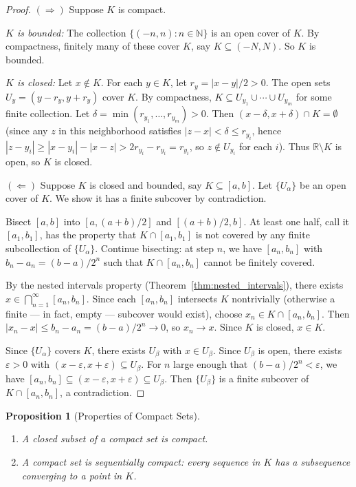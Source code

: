 \documentclass[11pt,a4paper]{article}
\theoremstyle{definition}
\theoremstyle{plain}
\newtheorem{proposition}[theorem]{Proposition}
\theoremstyle{remark}
\newcommand{\R}{\mathbb{R}}
\newcommand{\N}{\mathbb{N}}
\begin{document}
\begin{proof}
$(\Rightarrow)$ Suppose $K$ is compact.

\emph{$K$ is bounded:} The collection $\{(-n, n) : n \in \N\}$ is an open cover
of $K$. By compactness, finitely many of these cover $K$, say
$K \subseteq (-N, N)$. So $K$ is bounded.

\emph{$K$ is closed:} Let $x \notin K$. For each $y \in K$, let
$r_y = |x - y|/2 > 0$. The open sets $U_y = (y - r_y, y + r_y)$ cover $K$.
By compactness, $K \subseteq U_{y_1} \cup \cdots \cup U_{y_m}$ for some finite
collection. Let $\delta = \min(r_{y_1}, \ldots, r_{y_m}) > 0$. Then
$(x - \delta, x + \delta) \cap K = \emptyset$ (since any $z$ in this
neighborhood satisfies $|z - x| < \delta \le r_{y_i}$, hence
$|z - y_i| \ge |x - y_i| - |x - z| > 2r_{y_i} - r_{y_i} = r_{y_i}$,
so $z \notin U_{y_i}$ for each $i$). Thus $\R \setminus K$ is open, so $K$ is
closed.

$(\Leftarrow)$ Suppose $K$ is closed and bounded, say $K \subseteq [a, b]$. Let
$\{U_\alpha\}$ be an open cover of $K$. We show it has a finite subcover by
contradiction.

Bisect $[a, b]$ into $[a, (a+b)/2]$ and $[(a+b)/2, b]$. At least one half, call
it $[a_1, b_1]$, has the property that $K \cap [a_1, b_1]$ is not covered by any
finite subcollection of $\{U_\alpha\}$. Continue bisecting: at step $n$, we have
$[a_n, b_n]$ with $b_n - a_n = (b-a)/2^n$ such that $K \cap [a_n, b_n]$ cannot
be finitely covered.

By the nested intervals property (Theorem~\ref{thm:nested_intervals}), there
exists $x \in \bigcap_{n=1}^\infty [a_n, b_n]$. Since each $[a_n, b_n]$ intersects
$K$ nontrivially (otherwise a finite --- in fact, empty --- subcover would exist),
choose $x_n \in K \cap [a_n, b_n]$. Then $|x_n - x| \le b_n - a_n = (b-a)/2^n
\to 0$, so $x_n \to x$. Since $K$ is closed, $x \in K$.

Since $\{U_\alpha\}$ covers $K$, there exists $U_\beta$ with $x \in U_\beta$.
Since $U_\beta$ is open, there exists $\varepsilon > 0$ with
$(x - \varepsilon, x + \varepsilon) \subseteq U_\beta$. For $n$ large enough that
$(b-a)/2^n < \varepsilon$, we have $[a_n, b_n] \subseteq (x - \varepsilon,
x + \varepsilon) \subseteq U_\beta$. Then $\{U_\beta\}$ is a finite subcover
of $K \cap [a_n, b_n]$, a contradiction.
\end{proof}

\begin{proposition}[Properties of Compact Sets]
\label{prop:compact_props}
\begin{enumerate}[nosep,label=(\roman*)]
    \item A closed subset of a compact set is compact.
    \item A compact set is sequentially compact: every sequence in $K$ has a
    subsequence converging to a point in $K$.
\end{enumerate}
\end{proposition}
\end{document}

